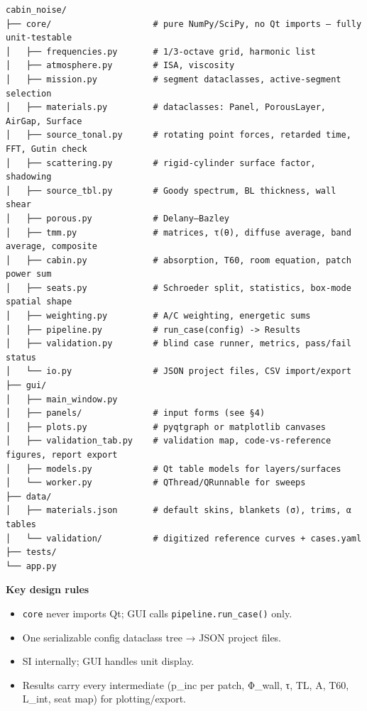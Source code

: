 \documentclass[10pt,a4paper]{article}
\begin{document}
\begin{Verbatim}[breaklines,fontsize=\small,frame=single,rulecolor=\color{gray}]
cabin_noise/
├── core/                    # pure NumPy/SciPy, no Qt imports — fully unit-testable
│   ├── frequencies.py       # 1/3-octave grid, harmonic list
│   ├── atmosphere.py        # ISA, viscosity
│   ├── mission.py           # segment dataclasses, active-segment selection
│   ├── materials.py         # dataclasses: Panel, PorousLayer, AirGap, Surface
│   ├── source_tonal.py      # rotating point forces, retarded time, FFT, Gutin check
│   ├── scattering.py        # rigid-cylinder surface factor, shadowing
│   ├── source_tbl.py        # Goody spectrum, BL thickness, wall shear
│   ├── porous.py            # Delany–Bazley
│   ├── tmm.py               # matrices, τ(θ), diffuse average, band average, composite
│   ├── cabin.py             # absorption, T60, room equation, patch power sum
│   ├── seats.py             # Schroeder split, statistics, box-mode spatial shape
│   ├── weighting.py         # A/C weighting, energetic sums
│   ├── pipeline.py          # run_case(config) -> Results
│   ├── validation.py        # blind case runner, metrics, pass/fail status
│   └── io.py                # JSON project files, CSV import/export
├── gui/
│   ├── main_window.py
│   ├── panels/              # input forms (see §4)
│   ├── plots.py             # pyqtgraph or matplotlib canvases
│   ├── validation_tab.py    # validation map, code-vs-reference figures, report export
│   ├── models.py            # Qt table models for layers/surfaces
│   └── worker.py            # QThread/QRunnable for sweeps
├── data/
│   ├── materials.json       # default skins, blankets (σ), trims, α tables
│   └── validation/          # digitized reference curves + cases.yaml
├── tests/
└── app.py
\end{Verbatim}

\textbf{Key design rules}

\begin{itemize}
\item \texttt{core} never imports Qt; GUI calls \texttt{pipeline.\allowbreak{}run\_\allowbreak{}case()} only.
\item One serializable config dataclass tree → JSON project files.
\item SI internally; GUI handles unit display.
\item Results carry every intermediate (p\_inc per patch, Φ\_wall, τ, TL, A, T60, L\_int, seat map) for plotting/export.
\end{itemize}
\end{document}

